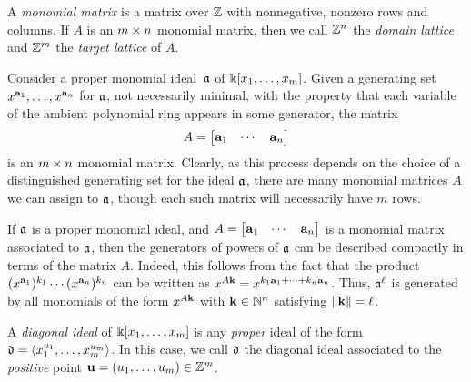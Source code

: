 \documentclass{amsart}
\begin{document}
\begin{definition}
\label{monomial matrix: D}
A \emph{monomial matrix} is a matrix over $\mathbb{Z}$ with nonnegative, nonzero rows and columns.
If $A$ is an $m \times n$ monomial matrix, then we call $\mathbb{Z}^n$ the \emph{domain lattice} and $\mathbb{Z}^m$ the \emph{target lattice} of $A$.
\end{definition}

\begin{remark}
   \label{monomial matrix ideal: R}
   Consider a proper monomial ideal~$\mathfrak{a}$ of $\Bbbk[x_1, \ldots, x_{m}]$.
   Given a generating set $x^{\mathbf{a}_1}, \ldots, x^{\mathbf{a}_n}$ for $\mathfrak{a}$, not necessarily minimal, with the property that each variable of the ambient polynomial ring appears in some generator, the matrix
   \[
      A= \begin{bmatrix} \mathbf{a}_1 & \cdots & \mathbf{a}_n \end{bmatrix}
   \]
   is an  $m \times n$ monomial matrix.
   Clearly, as this process depends on the choice of a distinguished generating set for the ideal $\mathfrak{a}$, there are many monomial matrices $A$ we can assign to $\mathfrak{a}$, though each such matrix will necessarily have $m$ rows.
\end{remark}

\begin{remark}
   \label{generators-via-exponent-matrix: R}
   If $\mathfrak{a}$ is a proper monomial ideal, and $A= \begin{bmatrix} \mathbf{a}_1 & \cdots & \mathbf{a}_n \end{bmatrix}$ is a monomial matrix associated to $\mathfrak{a}$, then the generators of powers of $\mathfrak{a}$ can be described compactly in terms of the matrix $A$.
   Indeed, this follows from the fact that the product $(x^{\mathbf{a}_1})^{k_1} \cdots (x^{\mathbf{a}_n})^{k_n}$ can be written as $x^{A \mathbf{k}} = x^{k_1 \mathbf{a}_1 + \cdots + k_n \mathbf{a}_n}$.
   Thus, $\mathfrak{a}^\ell$ is generated by all monomials of the form $x^{A \mathbf{k}}$ with $\mathbf{k} \in \mathbb{N}^n$ satisfying $\| \mathbf{k} \| = \ell$.
\end{remark}

\begin{definition}
   A  \emph{diagonal ideal} of $\Bbbk[x_1, \ldots, x_{m}]$ is any \emph{proper} ideal of the form $\mathfrak{d} = \langle x_1^{u_1}, \ldots, x_{m}^{u_{m}} \rangle$.
   In this case,  we call $\mathfrak{d}$ the diagonal ideal associated to the \emph{positive} point $\mathbf{u} = (u_1, \ldots, u_{m}) \in \mathbb{Z}^{m}$.
\end{definition}
\end{document}
